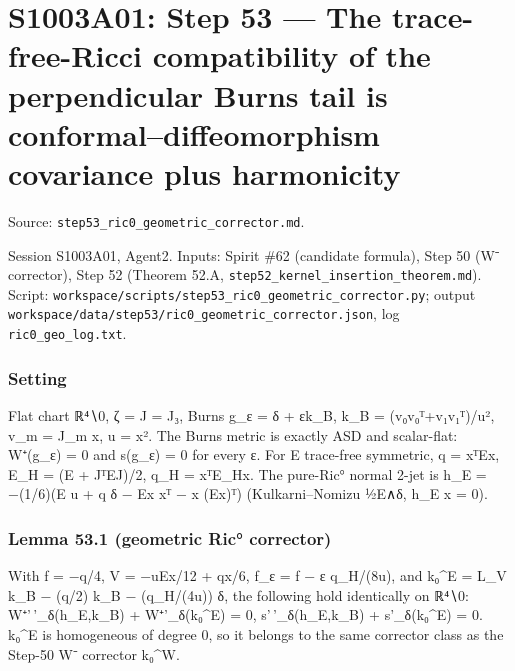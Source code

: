 \documentclass[
  10pt,
]{report}
\begin{document}
\hypertarget{s1003a01-step-53-the-trace-free-ricci-compatibility-of-the-perpendicular-burns-tail-is-conformaldiffeomorphism-covariance-plus-harmonicity}{%
\chapter{S1003A01: Step 53 --- The trace-free-Ricci compatibility of the
perpendicular Burns tail is conformal--diffeomorphism covariance plus
harmonicity}\label{s1003a01-step-53-the-trace-free-ricci-compatibility-of-the-perpendicular-burns-tail-is-conformaldiffeomorphism-covariance-plus-harmonicity}}

Source: \texttt{step53\_ric0\_geometric\_corrector.md}.

Session S1003A01, Agent2. Inputs: Spirit \#62 (candidate formula), Step
50 (W⁻ corrector), Step 52 (Theorem 52.A,
\texttt{step52\_kernel\_insertion\_theorem.md}). Script:
\texttt{workspace/scripts/step53\_ric0\_geometric\_corrector.py}; output
\texttt{workspace/data/step53/ric0\_geometric\_corrector.json}, log
\texttt{ric0\_geo\_log.txt}.

\hypertarget{setting}{%
\subsection{Setting}\label{setting}}

Flat chart ℝ⁴∖0, ζ = J = J₃, Burns g\_ε = δ + εk\_B, k\_B =
(v₀v₀ᵀ+v₁v₁ᵀ)/u², v\_m = J\_m x, u = \textbar x\textbar². The Burns
metric is exactly ASD and scalar-flat: W⁺(g\_ε) = 0 and s(g\_ε) = 0 for
every ε. For E trace-free symmetric, q = xᵀEx, E\_H = (E + JᵀEJ)/2, q\_H
= xᵀE\_Hx. The pure-Ric° normal 2-jet is h\_E = −(1/6)(E u + q δ − Ex xᵀ
− x (Ex)ᵀ) (Kulkarni--Nomizu ½E∧δ, h\_E x = 0).

\hypertarget{lemma-53.1-geometric-ric-corrector}{%
\subsection{Lemma 53.1 (geometric Ric°
corrector)}\label{lemma-53.1-geometric-ric-corrector}}

With f = −q/4, V = −uEx/12 + qx/6, f\_ε = f − ε q\_H/(8u), and k₀\^{}E =
L\_V k\_B − (q/2) k\_B − (q\_H/(4u)) δ, the following hold identically
on ℝ⁴∖0: W⁺'\,'\_δ(h\_E,k\_B) + W⁺'\_δ(k₀\^{}E) = 0, s'\,'\_δ(h\_E,k\_B)
+ s'\_δ(k₀\^{}E) = 0. k₀\^{}E is homogeneous of degree 0, so it belongs
to the same corrector class as the Step-50 W⁻ corrector k₀\^{}W.
\end{document}
